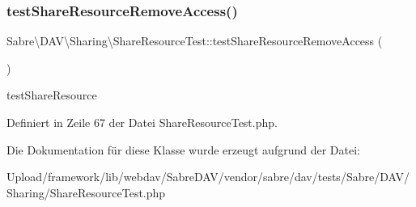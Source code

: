 \subsubsection{\texorpdfstring{test\+Share\+Resource\+Remove\+Access()}{testShareResourceRemoveAccess()}}
{\footnotesize\ttfamily Sabre\textbackslash{}\+D\+A\+V\textbackslash{}\+Sharing\textbackslash{}\+Share\+Resource\+Test\+::test\+Share\+Resource\+Remove\+Access (\begin{DoxyParamCaption}{ }\end{DoxyParamCaption})}

test\+Share\+Resource 

Definiert in Zeile 67 der Datei Share\+Resource\+Test.\+php.



Die Dokumentation für diese Klasse wurde erzeugt aufgrund der Datei\+:\begin{DoxyCompactItemize}
\item 
Upload/framework/lib/webdav/\+Sabre\+D\+A\+V/vendor/sabre/dav/tests/\+Sabre/\+D\+A\+V/\+Sharing/Share\+Resource\+Test.\+php\end{DoxyCompactItemize}
